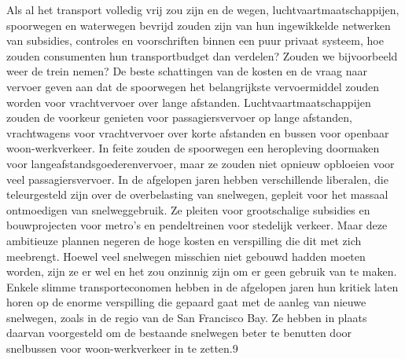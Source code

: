 \documentclass[
  a5paper,
  smalldemyvopaper,10pt,twoside,onecolumn,openright,extrafontsizes,hidelinks]{memoir}
\begin{document}
Als al het transport volledig vrij zou zijn en de wegen,
luchtvaartmaatschappijen, spoorwegen en waterwegen bevrijd zouden zijn
van hun ingewikkelde netwerken van subsidies, controles en voorschriften
binnen een puur privaat systeem, hoe zouden consumenten hun
transportbudget dan verdelen? Zouden we bijvoorbeeld weer de trein
nemen? De beste schattingen van de kosten en de vraag naar vervoer geven
aan dat de spoorwegen het belangrijkste vervoermiddel zouden worden voor
vrachtvervoer over lange afstanden. Luchtvaartmaatschappijen zouden de
voorkeur genieten voor passagiersvervoer op lange afstanden,
vrachtwagens voor vrachtvervoer over korte afstanden en bussen voor
openbaar woon-werkverkeer. In feite zouden de spoorwegen een heropleving
doormaken voor langeafstandsgoederenvervoer, maar ze zouden niet opnieuw
opbloeien voor veel passagiersvervoer. In de afgelopen jaren hebben
verschillende liberalen, die teleurgesteld zijn over de overbelasting
van snelwegen, gepleit voor het massaal ontmoedigen van snelweggebruik.
Ze pleiten voor grootschalige subsidies en bouwprojecten voor metro's en
pendeltreinen voor stedelijk verkeer. Maar deze ambitieuze plannen
negeren de hoge kosten en verspilling die dit met zich meebrengt. Hoewel
veel snelwegen misschien niet gebouwd hadden moeten worden, zijn ze er
wel en het zou onzinnig zijn om er geen gebruik van te maken. Enkele
slimme transporteconomen hebben in de afgelopen jaren hun kritiek laten
horen op de enorme verspilling die gepaard gaat met de aanleg van nieuwe
snelwegen, zoals in de regio van de San Francisco Bay. Ze hebben in
plaats daarvan voorgesteld om de bestaande snelwegen beter te benutten
door snelbussen voor woon-werkverkeer in te zetten.9
\end{document}
